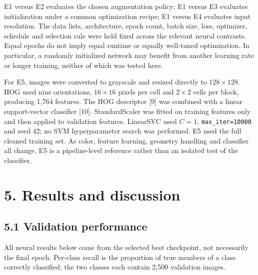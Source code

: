 \documentclass[
  10pt,
  a4paper,
]{article}
\begin{document}
E1 versus E2 evaluates the chosen augmentation policy; E1 versus E3
evaluates initialization under a common optimization recipe; E1 versus
E4 evaluates input resolution. The data lists, architecture, epoch
count, batch size, loss, optimizer, schedule and selection rule were
held fixed across the relevant neural contrasts. Equal epochs do not
imply equal runtime or equally well-tuned optimization. In particular, a
randomly initialized network may benefit from another learning rate or
longer training, neither of which was tested here.

For E5, images were converted to grayscale and resized directly to
\(128 \times 128\). HOG used nine orientations, \(16 \times 16\) pixels
per cell and \(2 \times 2\) cells per block, producing 1,764 features.
The HOG descriptor {[}9{]} was combined with a linear support-vector
classifier {[}10{]}. StandardScaler was fitted on training features only
and then applied to validation features. LinearSVC used \(C=1\),
\texttt{max\_iter=10000} and seed 42; no SVM hyperparameter search was
performed. E5 used the full cleaned training set. As color, feature
learning, geometry handling and classifier all change, E5 is a
pipeline-level reference rather than an isolated test of the classifier.

\section{5. Results and discussion}\label{results-and-discussion}

\subsection{5.1 Validation performance}\label{validation-performance}

All neural results below come from the selected best checkpoint, not
necessarily the final epoch. Per-class recall is the proportion of true
members of a class correctly classified; the two classes each contain
2,500 validation images.
\end{document}

